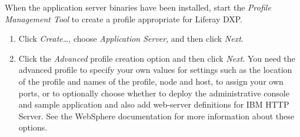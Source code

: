 When the application server binaries have been installed, start the
\emph{Profile Management Tool} to create a profile appropriate for
Liferay DXP.

\begin{enumerate}
\def\labelenumi{\arabic{enumi}.}
\item
  Click \emph{Create\ldots{}}, choose \emph{Application Server}, and
  then click \emph{Next}.
\item
  Click the \emph{Advanced} profile creation option and then click
  \emph{Next}. You need the advanced profile to specify your own values
  for settings such as the location of the profile and names of the
  profile, node and host, to assign your own ports, or to optionally
  choose whether to deploy the administrative console and sample
  application and also add web-server definitions for IBM HTTP Server.
  See the WebSphere documentation for more information about these
  options.


\end{enumerate}
